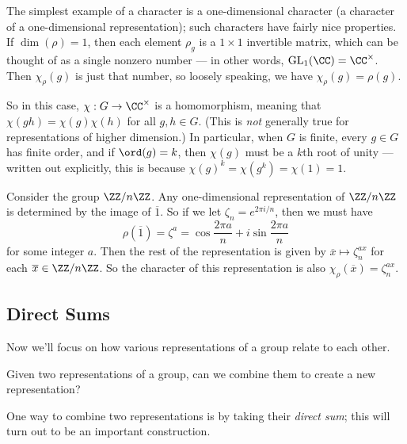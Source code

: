 The simplest example of a character is a one-dimensional character (a character of a one-dimensional representation); such characters have fairly nice properties. If $\dim(\rho) = 1$, then each element $\rho_g$ is a $1 \times 1$ invertible matrix, which can be thought of as a single nonzero number --- in other words, $\operatorname{GL}_1(\CC) = \CC^\times$. Then $\chi_\rho(g)$ is just that number, so loosely speaking, we have $\chi_\rho(g) = \rho(g)$. 

So in this case, $\chi : G \to \CC^\times$ is a homomorphism, meaning that $\chi(gh) = \chi(g)\chi(h)$ for all $g, h \in G$. (This is \emph{not} generally true for representations of higher dimension.) In particular, when $G$ is finite, every $g \in G$ has finite order, and if $\ord(g) = k$, then $\chi(g)$ must be a $k$th root of unity --- written out explicitly, this is because $\chi(g)^k = \chi(g^k) = \chi(1) = 1$. 
 
\begin{example}
    Consider the group $\ZZ/n\ZZ$. Any one-dimensional representation of $\ZZ/n\ZZ$ is determined by the image of $\overline{1}$. So if we let $\zeta_n = e^{2\pi i/n}$, then we must have \[\rho(\overline{1}) = \zeta^a = \cos \frac{2\pi a}{n} + i \sin \frac{2\pi a}{n}\] for some integer $a$. Then the rest of the representation is given by $\overline{x} \mapsto \zeta_n^{ax}$ for each $\overline{x} \in \ZZ/n\ZZ$. So the character of this representation is also $\chi_\rho(\overline{x}) = \zeta_n^{ax}$.
\end{example}
 
\subsection{Direct Sums}

Now we'll focus on how various representations of a group relate to each other. 


\begin{qq}
Given two representations of a group, can we combine them to create a new representation?
\end{qq}

One way to combine two representations is by taking their \emph{direct sum}; this will turn out to be an important construction. 


